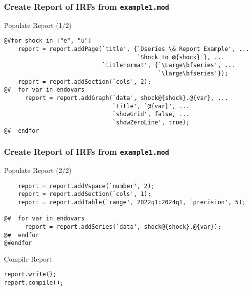 \documentclass[10pt]{beamer}
\begin{document}
\begin{frame}[fragile=singleslide,t]
  \frametitle{Create Report of IRFs from \texttt{example1.mod}}
  \begin{block}{Populate Report (1/2)}
\small{
\begin{verbatim}
@#for shock in ["e", "u"]
    report = report.addPage(`title', {`Dseries \& Report Example', ...
                                      `Shock to @{shock}'}, ...
                            `titleFormat', {`\Large\bfseries', ...
                                            `\large\bfseries'});
    report = report.addSection(`cols', 2);
@#  for var in endovars
      report = report.addGraph(`data', shock@{shock}.@{var}, ...
                               `title', `@{var}', ...
                               `showGrid', false, ...
                               `showZeroLine', true);
@#  endfor
\end{verbatim}
}
  \end{block}
\end{frame}


\begin{frame}[fragile=singleslide,t]
  \frametitle{Create Report of IRFs from \texttt{example1.mod}}
  \begin{block}{Populate Report (2/2)}
\small{
\begin{verbatim}
    report = report.addVspace(`number', 2);
    report = report.addSection(`cols', 1);
    report = report.addTable(`range', 2022q1:2024q1, `precision', 5);

@#  for var in endovars
      report = report.addSeries(`data', shock@{shock}.@{var});
@#  endfor
@#endfor
\end{verbatim}
}
  \end{block}

  \begin{block}{Compile Report}
\small{
\begin{verbatim}
report.write();
report.compile();
\end{verbatim}
}
  \end{block}
\end{frame}
\end{document}
